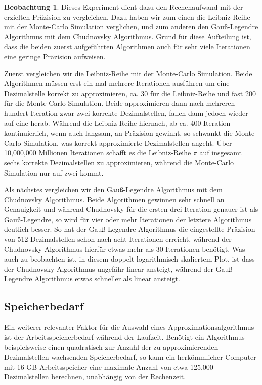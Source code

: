 \documentclass{scrartcl}
\theoremstyle{definition}
\newtheorem{approximation sequence}{Annäherungsfolge}
\newtheorem{observation}{Beobachtung}
\begin{document}
\begin{observation}
    Dieses Experiment dient dazu den Rechenaufwand mit der erzielten Präzision zu vergleichen. Dazu haben wir zum einen die Leibniz-Reihe mit 
    der Monte-Carlo Simulation verglichen, und zum anderen den Gauß-Legendre Algorithmus mit dem Chudnovsky Algorithmus.
    Grund für diese Aufteilung ist, dass die beiden zuerst aufgeführten Algorithmen auch für sehr viele Iterationen eine geringe Präzision aufweisen.
    
    Zuerst vergleichen wir die Leibniz-Reihe mit der Monte-Carlo Simulation. Beide Algorithmen müssen erst ein mal mehrere Iterationen ausführen um eine
    Dezimalstelle korrekt zu approximieren, ca. 30 für die Leibniz-Reihe und fast 200 für die Monte-Carlo Simulation. Beide approximieren dann nach mehreren 
    hundert Iteration zwar zwei korrekte Dezimalstellen, fallen dann jedoch wieder auf eine herab.
    Während die Leibniz-Reihe hiernach, ab ca. 400 Iteration kontinuierlich, wenn auch langsam, an Präzision gewinnt, so schwankt die Monte-Carlo Simulation, was korrekt approximierte 
    Dezimalstellen angeht.
    Über 10,000,000 Millionen Iterationen schafft es die Leibniz-Reihe \(\pi\) auf insgesamt sechs korrekte Dezimalstellen zu approximieren, während die Monte-Carlo Simulation nur auf zwei kommt.
    
    Als nächstes vergleichen wir den Gauß-Legendre Algorithmus mit dem Chudnovsky Algorithmus. Beide Algorithmen gewinnen sehr schnell an Genauigkeit und während Chudnovsky für die ersten drei
    Iteration genauer ist als Gauß-Legendre, so wird für vier oder mehr Iterationen der letztere Algorithmus deutlich besser. So hat der Gauß-Legendre Algorithmus die eingestellte Präzision von 512 Dezimalstellen schon nach
    acht Iterationen erreicht, während der Chudnovsky Algorithmus hierfür etwas mehr als 30 Iterationen benötigt. Was auch zu beobachten ist, in diesem doppelt logarithmisch skaliertem Plot, ist dass der Chudnovsky Algorithmus
    ungefähr linear ansteigt, während der Gauß-Legendre Algorithmus etwas schneller als linear ansteigt.
\end{observation}

\pagebreak

\subsection{Speicherbedarf}

Ein weiterer relevanter Faktor für die Auswahl eines Approximationsalgorithmus
ist der Arbeitsspeicherbedarf während der Laufzeit. Benötigt ein Algorithmus
beispielsweise einen quadratisch zur Anzahl der zu approximierenden
Dezimalstellen wachsenden Speicherbedarf, so kann ein herkömmlicher Computer
mit 16 GB Arbeitsspeicher eine maximale Anzahl von etwa 125,000 Dezimalstellen
berechnen, unabhängig von der Rechenzeit.
\end{document}
